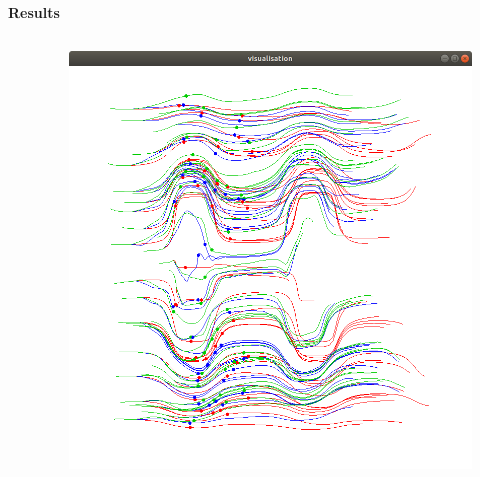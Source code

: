 \documentclass[xcolor=dvipsnames]{beamer}
\begin{document}
\begin{frame}{\bf Results}


\begin{columns}

    \begin{column}{0.5\textwidth}


    \end{column}

    \begin{column}{0.5\textwidth}  %

        \begin{figure}
          \includegraphics[scale=0.2]{../../diagrams/rbc_deep_network_6_7.png}
        \end{figure}

    \end{column}

\end{columns}

\end{frame}
\end{document}

